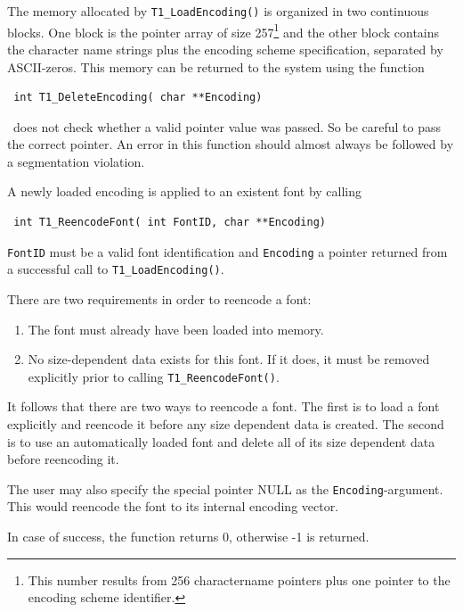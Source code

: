 The memory allocated by \verb+T1_LoadEncoding()+ is organized in two
continuous blocks. One block is the pointer array of size 257\footnote{This
  number results from 256 charactername pointers plus one pointer to the
  encoding scheme identifier.} and the
other block contains the character name strings plus the encoding scheme
specification, separated by
ASCII-zeros. 
This memory can be returned to the system using the function 
\precorr
\begin{verbatim}
 int T1_DeleteEncoding( char **Encoding)
\end{verbatim}\postcorr
\tonelib\ does not check whether a valid pointer value was passed. So be
careful to pass the correct pointer. An error in this function should almost
always be followed by a segmentation violation.

A newly loaded encoding is applied to an existent font by
calling 
\precorr
\begin{verbatim}
 int T1_ReencodeFont( int FontID, char **Encoding)
\end{verbatim}\postcorr
\verb+FontID+ must be a valid font identification and
\verb+Encoding+ a pointer returned from a
successful call to \verb+T1_LoadEncoding()+. 

There are two requirements
in order to reencode a font:
\begin{enumerate}
\item The font must already have been loaded into memory. 
\item No size-dependent data exists for this font. If
  it does, it must be removed explicitly prior to calling
  \verb+T1_ReencodeFont()+. 
\end{enumerate}

It follows that there are two ways to reencode a font. The first is
to load a font explicitly and reencode it before any size dependent
data is created. The second is to use an automatically loaded font
and delete all of its size dependent data before reencoding it.

The user may also specify the special pointer NULL as the
\verb+Encoding+-argument. This would reencode the font to its internal
encoding vector.

In case of success, the function returns 0, otherwise -1 is returned.


